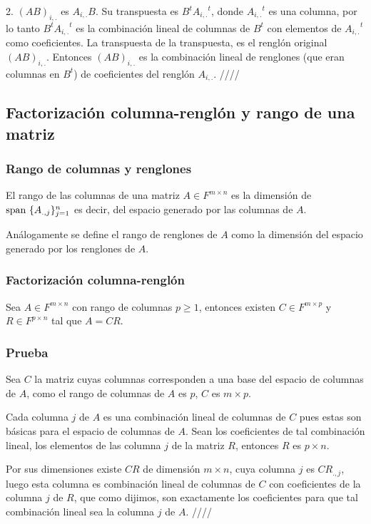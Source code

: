 \documentclass{article}
\begin{document}
2. $(AB)_{i,.}$ es $A_{i,.}B$. Su transpuesta es $B^t{A_{i,.}}^t$, donde
${A_{i,.}}^t$ es una columna, por lo tanto $B^t{A_{i,.}}^t$ es la combinación lineal de columnas de $B^t$ con
elementos de ${A_{i,.}}^t$ como coeficientes. La transpuesta de la
transpuesta, es el renglón original $(AB)_{i,.}$. Entonces
$(AB)_{i,.}$ es la combinación lineal de renglones (que eran columnas en $B^t$) de coeficientes del renglón $A_{i,.}$.
\hfill ////

\subsection{Factorización columna-renglón y rango de una matriz}
\subsubsection{Rango de columnas y renglones}
El rango de las columnas de una matriz $A\in F^{m\times n}$
es la dimensión de \\
$\text{span } \{A_{.,j}\}_{j=1}^n$ es decir, del
espacio generado por las columnas de $A$.

Análogamente se define el rango de renglones de $A$ como la 
dimensión del espacio generado por los renglones de $A$.

\subsubsection{Factorización columna-renglón}
Sea $A\in F^{m\times n}$ con rango de columnas $p\geq 1$,
entonces existen $C\in F^{m\times p}$ y $R\in F^{p\times n}$
tal que $A=CR$.
\subsubsection*{Prueba}
Sea $C$ la matriz cuyas columnas corresponden a una base del
espacio de columnas de $A$, como el rango de columnas de $A$ es $p$,
$C$ es $m\times p$.

Cada columna $j$ de $A$ es una combinación lineal
de columnas de $C$ pues estas son básicas para el espacio de columnas
de $A$. Sean los coeficientes de tal combinación lineal, los elementos
de las columna $j$ de la matriz $R$, entonces $R$ es $p\times n$.

Por sus dimensiones existe $CR$ de dimensión $m\times n$, cuya columna
$j$ es $CR_{.,j}$, luego esta columna es combinación lineal de columnas
de $C$ con coeficientes de la columna $j$ de $R$, que como dijimos, son
exactamente los coeficientes para que tal combinación lineal sea la columna $j$ de $A$. \hfill ////
\end{document}
